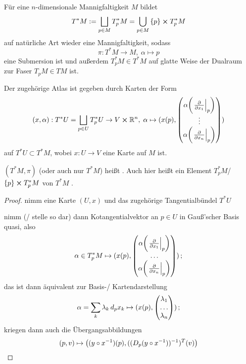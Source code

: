 \documentclass[../H_Analysis_main.tex]{subfiles}
\begin{document}
\begin{satz}
Für eine $n$-dimensionale Mannigfaltigkeit $M$ bildet
\begin{equation}
T^*M := \bigsqcup_{p \in M} T^*_p M = \bigcup_{p \in M} \qty{p} \cross T^*_p M
\end{equation}
auf natürliche Art wieder eine Mannigfaltigkeit, sodass
\begin{equation}
\pi: T^* M \rightarrow M, \; \alpha \mapsto p
\end{equation}
eine Submersion ist und außerdem $T^*_p M \in T^*M$ auf glatte Weise der Dualraum zur Faser $T_p M \in TM$ ist.

Der zugehörige Atlas ist gegeben durch Karten der Form
\begin{equation}\label{eq:indkktb}
(x, \alpha): T^* U = \bigsqcup_{p \in U} T^*_p U \rightarrow V \cross \mathbb{R}^n, \; \alpha \mapsto (x(p), \mqty(\alpha\qty(\eval{\pdv{x_1}}_p) \\ \vdots \\ \alpha\qty(\eval{\pdv{x_n}}_p)))
\end{equation}
auf $T^* U \subset T^* M$, wobei $x: U\rightarrow V$ eine Karte auf $M$ ist.
\end{satz}

\begin{defi}[Kotangentialbündel]
$(T^* M, \pi)$ (oder auch nur $T^*M$) heißt . Auch hier heißt ein Element $T^*_p M$/ $\qty{p} \cross T^*_p M $ von $T^*M$ .
\end{defi}

\begin{proof}
nimm eine Karte $(U, x)$ und das zugehörige Tangentialbündel $T^* U$

nimm (/ stelle so dar) dann Kotangentialvektor an $p \in U$ in Gauß'scher Basis quasi, also
\begin{equation*}
\alpha \in T^*_p M \mapsto (x(p), \mqty(\alpha\qty(\eval{\pdv{x_1}}_p) \\ \dots \\ \alpha\qty(\eval{\pdv{x_n}}_p))) \, ;
\end{equation*}
das ist dann äquivalent zur Basis-/ Kartendarstellung
\begin{equation*}
\alpha = \sum_k \lambda_k \, d_p x_k \mapsto (x(p), \mqty(\lambda_1 \\ \dots \\ \lambda_n)) \, ;
\end{equation*}
kriegen dann auch die Übergangsabbildungen
\begin{equation*}
(p, v) \mapsto \qty((y \circ x^{-1})(p), ((D_p (y \circ x^{-1}))^{-1})^T(v))
\end{equation*}
\end{proof}
\end{document}
